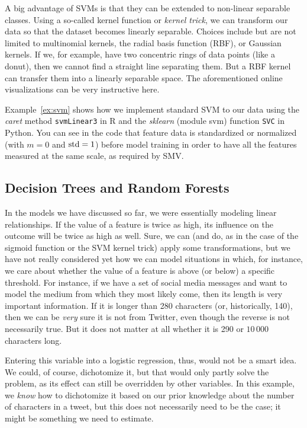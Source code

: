 A big advantage of SVMs is that they can be extended to non-linear
separable classes. Using a so-called kernel function or \emph{kernel trick}, we can transform
our data so that the dataset becomes linearly separable. Choices
include but are not limited to multinomial kernels, the radial basis
function (RBF), or Gaussian kernels. If we, for example, have  two
concentric rings of data points (like a donut), then we cannot find a
straight line separating them. But a RBF kernel can transfer them into
a linearly separable space. The aforementioned online visualizations
can be very instructive here.

Example~\ref{ex:svm} shows how we implement standard SVM to our data using the \emph{caret} method \texttt{svmLinear3} in R and the \emph{sklearn} (module svm) function \texttt{SVC} in Python. You can see in the code that feature data is standardized or normalized (with $m = 0$ and $\rm{std} = 1$) before model training in order to have all the features measured at the same scale, as required by SMV.




\subsection{Decision Trees and Random Forests}
\label{subsec:randomforest}
In the models we have discussed so far, we were essentially  modeling linear
relationships. If the value of a feature is twice as high, its
influence on the outcome will be twice as high as well.  Sure, we can
(and do, as in the case of the sigmoid function or the SVM kernel trick) apply some
transformations, but we have not really considered yet how we can
model situations in which, for instance, we care about whether the
value of a feature is above (or below) a specific threshold.  For
instance, if we have a set of social media messages and want to model
the medium from which they most likely come, then its length is very
important information. If it is longer than 280 characters (or,
historically, 140), then we can be \emph{very} sure it is not from
Twitter, even though the reverse is not necessarily true. But it does
not matter at all whether it is 290 or $10\,000$ characters long.

Entering this variable into a logistic regression, thus, would not be
a smart idea.  We could, of course, dichotomize it, but that would
only partly solve the problem, as its effect can still be overridden by other variables.  In this example, we \emph{know} how to
dichotomize it based on our prior knowledge about the number of
characters in a tweet, but this does not necessarily need to be the
case; it might be something we need to estimate.

